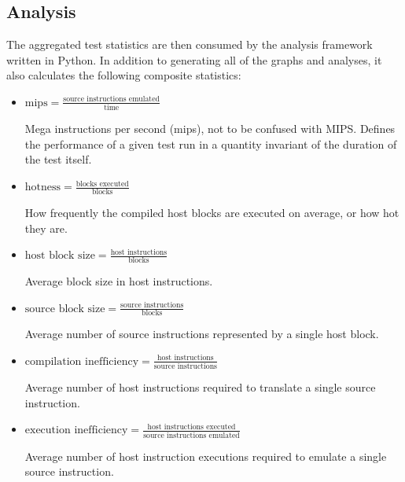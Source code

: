 \subsection{Analysis}

The aggregated test statistics are then consumed by the analysis framework written in Python. In addition to generating all of the graphs and analyses, it also calculates the following composite statistics:

\begin{itemize}
    \item \textbf{$\text{mips} = \frac{\text{source instructions emulated}}{\text{time}}$}
    
    Mega instructions per second (mips), not to be confused with MIPS. Defines the performance of a given test run in a quantity invariant of the duration of the test itself.

    \item \textbf{$\text{hotness} = \frac{\text{blocks executed}}{\text{blocks}}$}
    
    How frequently the compiled host blocks are executed on average, or how hot they are.

    \item \textbf{$\text{host block size} = \frac{\text{host instructions}}{\text{blocks}}$}
    
    Average block size in host instructions.

    \item \textbf{$\text{source block size} = \frac{\text{source instructions}}{\text{blocks}}$}

    Average number of source instructions represented by a single host block.

    \item \textbf{$\text{compilation inefficiency} = \frac{\text{host instructions}}{\text{source instructions}}$}
    
    Average number of host instructions required to translate a single source instruction.
    
    \item \textbf{$\text{execution inefficiency} = \frac{\text{host instructions executed}}{\text{source instructions emulated}}$}
    
    Average number of host instruction executions required to emulate a single source instruction.
\end{itemize}